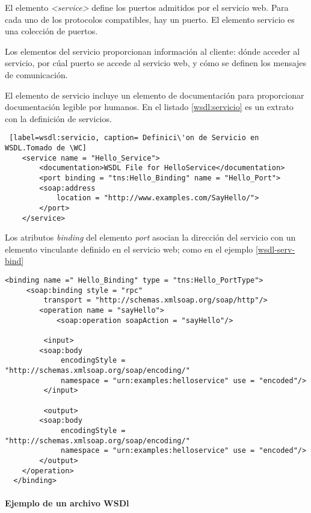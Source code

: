   El elemento \textit{<service>} define los puertos admitidos por el servicio web. Para cada uno de los protocolos compatibles, hay un puerto. El elemento  servicio es una colección de puertos.
  
  Los elementos del servicio proporcionan informaci\'on al cliente:   dónde acceder al servicio, por  c\'ual puerto se accede al servicio web, y
  cómo se definen los mensajes de comunicación.
  
  El elemento de servicio incluye un elemento de documentación para proporcionar documentación legible por humanos. En el listado \ref{wsdl:servicio} es un extrato con la definici\'on de servicios. 
  
  \begin{lstlisting} [label=wsdl:servicio, caption= Definici\'on de Servicio en WSDL.Tomado de \WC]
  	<service name = "Hello_Service">
  		<documentation>WSDL File for HelloService</documentation>
	  	<port binding = "tns:Hello_Binding" name = "Hello_Port">
	  	<soap:address
 		 	location = "http://www.examples.com/SayHello/">
  		</port>
  	</service>
   \end{lstlisting}
   
   Los atributos \textit{binding}  del elemento \textit{port} asocian la dirección del servicio con un elemento vinculante definido en el servicio web; como en el ejemplo \ref{wsdl-serv-bind} 
   
   \begin{lstlisting}[label=wsdl-serv-bind, caption=Enlaces y Puertos en la definici\'on de servicios. Tomado de \WC]
  <binding name =" Hello_Binding" type = "tns:Hello_PortType">
 	 <soap:binding style = "rpc"
 		 transport = "http://schemas.xmlsoap.org/soap/http"/>
  		<operation name = "sayHello">
  			<soap:operation soapAction = "sayHello"/>
  
	 	 <input>
 	 	<soap:body
	 		 encodingStyle = "http://schemas.xmlsoap.org/soap/encoding/"
	 		 namespace = "urn:examples:helloservice" use = "encoded"/>
	 	 </input>
  
	 	 <output>
	  	<soap:body
 			 encodingStyle = "http://schemas.xmlsoap.org/soap/encoding/"
 			 namespace = "urn:examples:helloservice" use = "encoded"/>
  		</output>
  	</operation>
  </binding> 	
   \end{lstlisting}


 
\paragraph{ Ejemplo de un archivo WSDl }

